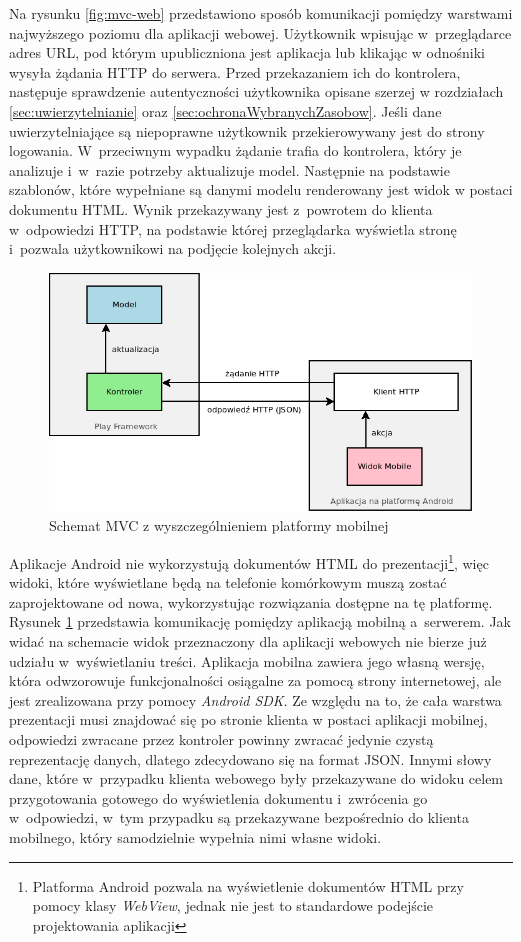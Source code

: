 \documentclass[11pt]{aghdpl}
\begin{document}
Na rysunku \ref{fig:mvc-web} przedstawiono sposób komunikacji pomiędzy warstwami najwyższego poziomu dla aplikacji webowej. Użytkownik wpisując w~przeglądarce adres URL, pod którym upubliczniona jest aplikacja lub klikając w odnośniki wysyła żądania HTTP do serwera. Przed przekazaniem ich do kontrolera, następuje sprawdzenie autentyczności użytkownika opisane szerzej w rozdziałach \ref{sec:uwierzytelnianie} oraz \ref{sec:ochronaWybranychZasobow}. Jeśli dane uwierzytelniające są niepoprawne użytkownik przekierowywany jest do strony logowania. W~przeciwnym wypadku żądanie trafia do kontrolera, który je analizuje i~w~razie potrzeby aktualizuje model. Następnie na podstawie szablonów, które wypełniane są danymi modelu renderowany jest widok w postaci dokumentu HTML. Wynik przekazywany jest z~powrotem do klienta w~odpowiedzi HTTP, na podstawie której przeglądarka wyświetla stronę i~pozwala użytkownikowi na podjęcie kolejnych akcji.

\begin{figure}[h!]
	\centering
	\includegraphics[width=\linewidth * 4/5]{MVC-MOBILE}
	\caption{Schemat MVC z wyszczególnieniem platformy mobilnej}
	\label{fig:mvc-mobile}
\end{figure}

Aplikacje Android nie wykorzystują dokumentów HTML do prezentacji\footnote{Platforma Android pozwala na wyświetlenie dokumentów HTML przy pomocy klasy \emph{WebView}, jednak nie jest to standardowe podejście projektowania aplikacji}, więc widoki, które wyświetlane będą na telefonie komórkowym muszą zostać zaprojektowane od nowa, wykorzystując rozwiązania dostępne na tę platformę. Rysunek \ref{fig:mvc-mobile} przedstawia komunikację pomiędzy aplikacją mobilną a~serwerem. Jak widać na schemacie widok przeznaczony dla aplikacji webowych nie bierze już udziału w~wyświetlaniu treści. Aplikacja mobilna zawiera jego własną wersję, która odwzorowuje funkcjonalności osiągalne za pomocą strony internetowej, ale jest zrealizowana przy pomocy \emph{Android SDK}. Ze względu na to, że cała warstwa prezentacji musi znajdować się po stronie klienta w postaci aplikacji mobilnej, odpowiedzi zwracane przez kontroler powinny zwracać jedynie czystą reprezentację danych, dlatego zdecydowano się na format JSON. Innymi słowy dane, które w~przypadku klienta webowego były przekazywane do widoku celem przygotowania gotowego do wyświetlenia dokumentu i~zwrócenia go w~odpowiedzi, w~tym przypadku są przekazywane bezpośrednio do klienta mobilnego, który samodzielnie wypełnia nimi własne widoki.
\end{document}
